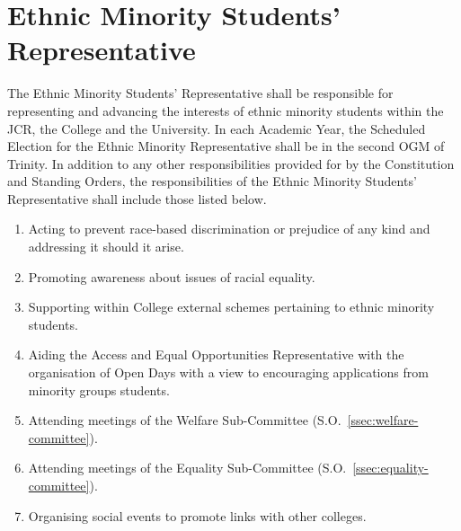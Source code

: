 \section{Ethnic Minority Students' Representative}
\npara The Ethnic Minority Students' Representative shall be responsible for representing and advancing the interests of ethnic minority students within the JCR, the College and the University. 
\npara In each Academic Year, the Scheduled Election for the Ethnic Minority Representative shall be in the second OGM of Trinity.
\npara In addition to any other responsibilities provided for by the Constitution and Standing Orders, the responsibilities of the Ethnic Minority Students' Representative shall include those listed below.
\begin{enumerate}
	\item Acting to prevent race-based discrimination or prejudice of any kind and addressing it should it arise.
	\item Promoting awareness about issues of racial equality.
	\item Supporting within College external schemes pertaining to ethnic minority students.
	\item Aiding the Access and Equal Opportunities Representative with the organisation of Open Days with a view to encouraging applications from minority groups students.
	\item Attending meetings of the Welfare Sub-Committee (S.O.~\ref{ssec:welfare-committee}).
	\item Attending meetings of the Equality Sub-Committee (S.O.~\ref{ssec:equality-committee}).
	\item Organising social events to promote links with other colleges.
\end{enumerate}
